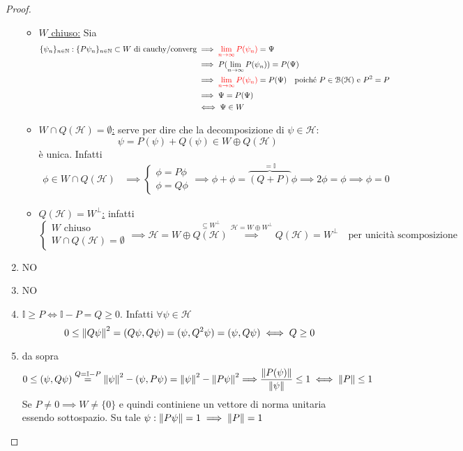 \documentclass[a4paper,10pt]{article}
\theoremstyle{definition}
\newcommand{\na}{\mathbb{N}} %
\newcommand{\hil}{\mathcal{H}} %
\theoremstyle{indentdefinition}
\theoremstyle{indenttheorem}
\theoremstyle{myremark}
\theoremstyle{indentgeneral}
\begin{document}
\begin{proof}
\begin{enumerate}
\begin{itemize}
            \item \underline{$W$ chiuso:} Sia 
            \begin{align*}
                \{\psi_n\}_{n\in\na} :  \{P\psi_n\}_{n\in\na} \subset W\text{ di cauchy/converg} &\implies \textcolor{red}{\lim_{n\to\infty}P(\psi_n)}=\Psi\\
                &\implies P(\lim_{n\to\infty}P(\psi_n))=P(\Psi)\\
                &\implies  \textcolor{red}{\lim_{n\to\infty}P(\psi_n)}=P(\Psi) \quad \text{poiché $P\in\mathcal{B}(\hil)$ e $P^2=P$}\\
                &\implies \Psi=P(\Psi)\\
                &\iff \Psi\in W
            \end{align*}
             \item \underline{$W\cap Q(\hil)=\emptyset$:} serve per dire che la decomposizione di $\psi\in\hil$:
             $$\psi={P(\psi)}+{Q(\psi)}\in W\oplus Q(\hil)$$
             è unica. Infatti
             \begin{align*}
                 \phi\in W\cap Q(\hil)&\implies\begin{cases}
                     \phi=P\phi \\
                     \phi = Q\phi
                 \end{cases}\implies \phi+\phi=\overbrace{(Q+P)}^{=\mathbb{I}}\phi \implies 2\phi=\phi\implies \phi=0
             \end{align*}
             \item \underline{$Q(\hil)= W^\perp$:} infatti
             $$\begin{cases}
                 W \text{ chiuso}\\
                 W\cap Q(\hil)=\emptyset
             \end{cases}\implies \hil =W \oplus \overset{\subseteq W^\perp}{Q(\hil)}\overset{\hil=W\oplus W^\perp}{\implies}Q(\hil)=W^\perp \quad \text{per unicità scomposizione}$$
        \end{itemize}
        \item NO
        \item NO
        \item $\mathbb{I}\ge P\iff \mathbb{I}-P=Q\ge 0$. Infatti  $\forall\psi\in\hil$
        $$0\le \norm{Q\psi}^2=(Q\psi,Q\psi)=(\psi,Q^2\psi)=(\psi,Q\psi)\iff Q\ge0$$
        \item da sopra 
        $$0\le(\psi,Q\psi)\overset{Q=\mathbb{I}-P}{=}\norm{\psi}^2-(\psi,P\psi)=\norm{\psi}^2-\norm{P\psi}^2{\implies} \frac{\norm{P(\psi)}}{\norm{\psi}}\le 1\iff \norm{P}\le 1$$
        Se $P\ne 0\implies W\ne \{0\}$ e quindi continiene un vettore di norma unitaria essendo sottospazio. Su tale $\psi: \norm{P\psi}=1\implies \norm{P}=1$
    \end{enumerate}
\end{proof}
\end{document}
